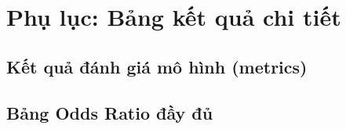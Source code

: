 \chapter{Phụ lục: Bảng kết quả chi tiết}

\section{Kết quả đánh giá mô hình (metrics)}



\section{Bảng Odds Ratio đầy đủ}



